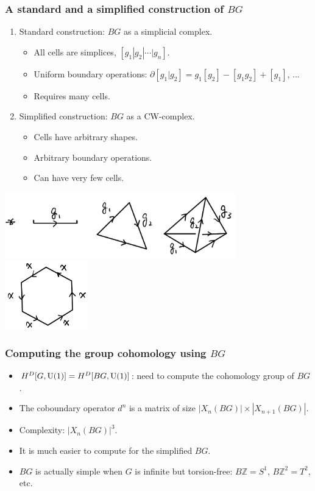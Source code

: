 \documentclass[xcolor=table, aspectratio=43,ignorenonframetext]{beamer}
\newcommand{\uone}{\text U(1)}
\begin{document}
\begin{frame}
	\frametitle{A standard and a simplified construction of $BG$}
	\begin{enumerate}
		\item Standard construction: $BG$ as a simplicial complex.
		\begin{itemize}
			\item All cells are simplices, $[g_1|g_2|\cdots|g_n]$.
			\item Uniform boundary operations:
			$\partial[g_1|g_2]=g_1[g_2]-[g_1g_2]+[g_1]$, ...
			\item Requires many cells.
		\end{itemize}
		\item Simplified construction: $BG$ as a CW-complex.
		\begin{itemize}
			\item Cells have arbitrary shapes.
			\item Arbitrary boundary operations.
			\item Can have very few cells.
		\end{itemize}
	\end{enumerate}
	\begin{center}
		\includegraphics[width=10cm]{../chainmap/bg-std}~~~~
		\includegraphics[height=3cm]{../chainmap/z6-1}
	\end{center}
\end{frame}

\begin{frame}
	\frametitle{Computing the group cohomology using $BG$}
	\begin{itemize}
		\item $H^D[G, \uone] = H^D[BG, \uone]$: need to compute the cohomology group of $BG$.
		\item The coboundary operator $d^n$ is a matrix of size $|X_n(BG)|\times |X_{n+1}(BG)|$.
		\item Complexity: $|X_n(BG)|^3$.
		\item It is much easier to compute for the simplified $BG$.
		\item $BG$ is actually simple when $G$ is infinite but torsion-free:
		$B\mathbb Z=S^1$, $B\mathbb Z^2=T^2$, etc.
	\end{itemize}
\end{frame}
\end{document}
